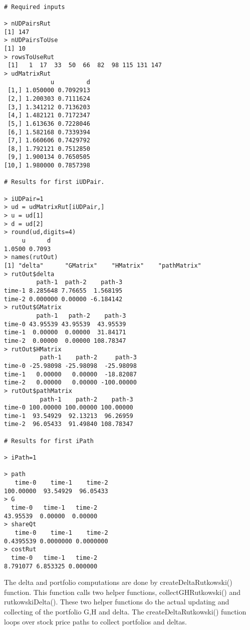 \documentclass[10pt]{article}
\begin{document}
\begin{verbatim}

# Required inputs

> nUDPairsRut
[1] 147
> nUDPairsToUse
[1] 10
> rowsToUseRut
 [1]   1  17  33  50  66  82  98 115 131 147
> udMatrixRut
             u         d
 [1,] 1.050000 0.7092913
 [2,] 1.200303 0.7111624
 [3,] 1.341212 0.7136203
 [4,] 1.482121 0.7172347
 [5,] 1.613636 0.7228046
 [6,] 1.582168 0.7339394
 [7,] 1.660606 0.7429792
 [8,] 1.792121 0.7512850
 [9,] 1.900134 0.7650505
[10,] 1.980000 0.7857398

# Results for first iUDPair.

> iUDPair=1
> ud = udMatrixRut[iUDPair,]
> u = ud[1]
> d = ud[2]
> round(ud,digits=4)
     u      d
1.0500 0.7093
> names(rutOut)
[1] "delta"      "GMatrix"    "HMatrix"    "pathMatrix"
> rutOut$delta
         path-1  path-2    path-3
time-1 8.285648 7.76655  1.568195
time-2 0.000000 0.00000 -6.184142
> rutOut$GMatrix
         path-1   path-2    path-3
time-0 43.95539 43.95539  43.95539
time-1  0.00000  0.00000  31.84171
time-2  0.00000  0.00000 108.78347
> rutOut$HMatrix
          path-1    path-2     path-3
time-0 -25.98098 -25.98098  -25.98098
time-1   0.00000   0.00000  -18.82087
time-2   0.00000   0.00000 -100.00000
> rutOut$pathMatrix
          path-1    path-2    path-3
time-0 100.00000 100.00000 100.00000
time-1  93.54929  92.13213  96.26959
time-2  96.05433  91.49840 108.78347

# Results for first iPath

> iPath=1

> path
   time-0    time-1    time-2
100.00000  93.54929  96.05433
> G
  time-0   time-1   time-2
43.95539  0.00000  0.00000
> shareQt
   time-0    time-1    time-2
0.4395539 0.0000000 0.0000000
> costRut
  time-0   time-1   time-2
8.791077 6.853325 0.000000
\end{verbatim}


The delta and portfolio computations are done by createDeltaRutkowski() function. This function calls two helper functions,
collectGHRutkowski() and rutkowskiDelta(). These two helper functions do the actual updating and collecting of the portfolio G,H and delta.
The createDeltaRutkowski() function loops over stock price paths to collect portfolios and deltas.
\end{document}

